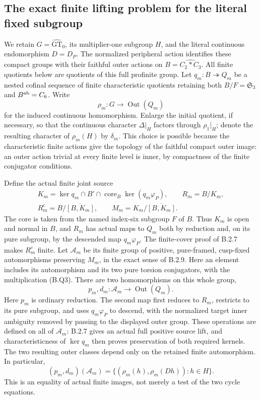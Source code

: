 \subsection{The exact finite lifting problem for the literal fixed subgroup}

We retain $G=\widehat{\mathrm{GT}}_0$, its multiplier-one
subgroup $H$, and the literal continuous endomorphism $D=D_P$.
The normalized peripheral action identifies these compact groups
with their faithful outer actions on $B=\widehat{C_2*C_3}$.
All finite quotients below are quotients of this full profinite
group.  Let $q_m:B\twoheadrightarrow Q_m$ be a nested cofinal
sequence of finite characteristic quotients retaining both
$B/F=\mathfrak S_3$ and $B^{\rm ab}=C_6$.
Write
\[
 \rho_m:G\longrightarrow\operatorname{Out}(Q_m)
 \tag{B.X1}
\]
for the induced continuous homomorphism.  Enlarge the initial
quotient, if necessary, so that the continuous character
$\Delta|_H$ factors through $\rho_1|_H$; denote the resulting
character of $\rho_m(H)$ by $\delta_m$.
This choice is possible because the characteristic finite
actions give the topology of the faithful compact outer image:
an outer action trivial at every finite level is inner, by
compactness of the finite conjugator conditions.

Define the actual finite joint source
\[
 \begin{gathered}
 K_m=\ker q_m\cap B'\cap
       \operatorname{core}_{B}\ker(q_m\varphi_P),
       \qquad R_m=B/K_m,\\
 R_m^c=B/\overline{[B,K_m]},\qquad
 M_m=K_m/\overline{[B,K_m]} .
 \end{gathered}                                      \tag{B.X2}
\]
The core is taken from the named index-six subgroup $F$ of $B$.
Thus $K_m$ is open and normal in $B$, and $R_m$ has actual
maps to $Q_m$ both by reduction and, on its pure subgroup,
by the descended map $q_m\varphi_P$.  The finite-cover proof
of B.2.7 makes $R_m^c$ finite.  Let $\mathcal A_m$ be its
finite group of positive, pure-framed, cusp-fixed automorphisms
preserving $M_m$, in the exact sense of B.2.9.
Here an element includes its automorphism and its two
pure torsion conjugators, with the multiplication (B.Q3).
There are two homomorphisms on this whole group,
\[
 p_m,d_m:\mathcal A_m\longrightarrow\operatorname{Out}(Q_m).
 \tag{B.X3}
\]
Here $p_m$ is ordinary reduction.  The second map first
reduces to $R_m$, restricts to its pure subgroup, and uses
$q_m\varphi_P$ to descend, with the normalized target inner
ambiguity removed by passing to the displayed outer group.
These operations are defined on all of $\mathcal A_m$:
B.2.7 gives an actual full positive source lift, and
characteristicness of $\ker q_m$ then proves preservation
of both required kernels.  The two resulting outer classes
depend only on the retained finite automorphism.  In particular,
\[
 (p_m,d_m)(\mathcal A_m)
   =\{(\rho_m(h),\rho_m(Dh)):h\in H\}.
 \tag{B.X4}
\]
This is an equality of actual finite images, not merely a
test of the two cycle equations.

